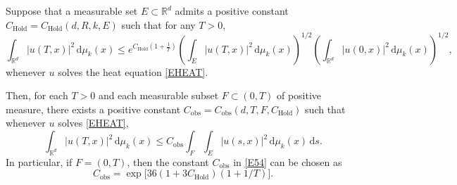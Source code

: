 \documentclass[12pt]{article}
\begin{document}
\begin{lemma}\label{lem:obs}
Suppose that a measurable set $E \subset \mathbb{R}^d$ admits a positive constant $C_{\mathrm{Hold}} = C_{\mathrm{Hold}}(d,R,k,E)$ such that for any $T>0$,
\begin{equation}\label{E53}
\int_{\mathbb{R}^d} |u(T,x)|^2 \, \mathrm{d}\mu_k(x)
\le e^{C_{\mathrm{Hold}}\left(1+\frac{1}{T}\right)}
\left(\int_{E} |u(T,x)|^2 \, \mathrm{d}\mu_k(x)\right)^{1/2}
\left(\int_{\mathbb{R}^d} |u(0,x)|^2 \, \mathrm{d}\mu_k(x)\right)^{1/2},
\end{equation}
whenever $u$ solves the heat equation \eqref{EHEAT}.

Then, for each $T>0$ and each measurable subset $F \subset (0,T)$ of positive measure, there exists a positive constant $C_{\mathrm{obs}} = C_{\mathrm{obs}}(d,T,F,C_{\mathrm{Hold}})$ such that whenever $u$ solves \eqref{EHEAT},
\begin{equation}\label{E54}
\int_{\mathbb{R}^d} |u(T,x)|^2 \, \mathrm{d}\mu_k(x)
\le C_{\mathrm{obs}} \int_{F} \int_{E} |u(s,x)|^2 \, \mathrm{d}\mu_k(x)\, \mathrm{d}s.
\end{equation}
In particular, if $F=(0,T)$, then the constant $C_{\mathrm{obs}}$ in \eqref{E54} can be chosen as
\[
C_{\mathrm{obs}} = \exp\bigl[36(1+3C_{\mathrm{Hold}})(1+1/T)\bigr].
\]
\end{lemma}
\end{document}
